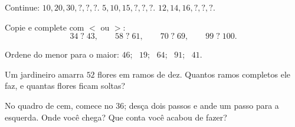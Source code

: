 \begin{exercise}[$\star$]\label{exo:g1:tens:5}
Continue: $10, 20, 30, ?, ?, ?$. \quad
$5, 10, 15, ?, ?, ?$. \quad $12, 14, 16, ?, ?, ?$.
\end{exercise}

\begin{exercise}[$\star$]\label{exo:g1:tens:6}
Copie e complete com $<$ ou $>$:
\[
34 \;?\; 43, \qquad
58 \;?\; 61, \qquad
70 \;?\; 69, \qquad
99 \;?\; 100 .
\]
\end{exercise}

\begin{exercise}[$\star$]\label{exo:g1:tens:7}
Ordene do menor para o maior: $46$; \ $19$; \ $64$; \ $91$; \
$41$.
\end{exercise}

\begin{exercise}[$\star$]\label{exo:g1:tens:8}
Um jardineiro amarra $52$ flores em ramos de dez. Quantos ramos
completos ele faz, e quantas flores ficam soltas?
\end{exercise}

\begin{exercise}[$\star\star$]\label{exo:g1:tens:9}
No quadro de cem, comece no $36$; desça dois passos e ande um passo
para a esquerda. Onde você chega? Que conta você acabou de fazer?
\end{exercise}
